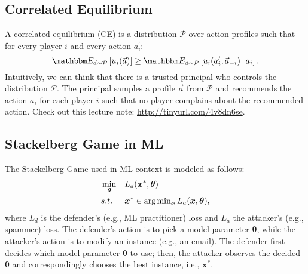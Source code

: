 
\subsection{Correlated Equilibrium}
    A correlated equilibrium (CE) is a distribution $\mathcal{P}$ over action profiles such that for every player $i$ and every action $a_i^\prime$:
        \begin{equation}
            \E_{\vec{a} \sim \mathcal{P}}\left[ u_i(\vec{a})\right] \ge \E_{\vec{a} \sim \mathcal{P}}\left[ u_i(a_i^\prime, \vec{a}_{-i})\, | \, a_i\right].
        \end{equation}
    Intuitively, we can think that there is a trusted principal who controls the distribution $\mathcal{P}$.
    The principal samples a profile $\vec{a}$ from $\mathcal{P}$ and recommends the action $a_i$ for each player $i$ such that no player complains about the recommended action.
    Check out this lecture note: \url{http://tinyurl.com/4v8dn6se}.


\subsection{Stackelberg Game in ML}
    The Stackelberg Game used in ML context is modeled as follows:
        \begin{equation}\label{eq:stackelberg-ml}
            \begin{aligned}
                    & \min_{\bm{\theta}} & & L_d(\bm{x}^\ast, \bm{\theta}) \\
                    & s.t.               & & \bm{x}^\ast \in \operatorname{arg\,min}_{\bm{x}} L_a(\bm{x}, \bm{\theta}),
            \end{aligned}
        \end{equation}
    where $L_d$ is the defender's (e.g., ML practitioner) loss and $L_a$ the attacker's (e.g., spammer) loss.
    The defender's action is to pick a model parameter $\bm{\theta}$, while the attacker's action is to modify an instance (e.g., an email).
    The defender first decides which model parameter $\bm{\theta}$ to use; then, the attacker observes the decided $\bm{\theta}$ and correspondingly chooses the best instance, i.e., $\bm{x}^\ast$.
    
